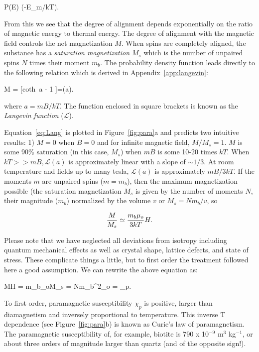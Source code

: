 \beq
P(E) \propto \exp (-E_m/kT).
\label{eq:PE}
\eeq

\noindent From this we see that the degree of alignment depends exponentially on the ratio of magnetic energy to thermal energy.  The degree of alignment with the magnetic field controls the net magnetization $M$.  When spins are completely aligned, the substance has a
 {\it saturation magnetization} $M_s$ which is the number of unpaired spins $N$ times their moment $m_b$.  The probability density function leads directly to the following relation which is derived in  Appendix~\ref{app:langevin}: 

\beq
{M} =
{ [\hbox{coth }a -
{
1
}]=(a).
}
\label{eq:Lang} 
\eeq

\noindent where  $a=mB/kT$. The function enclosed in square brackets is known as the 
{\it Langevin function} ($\mathcal{L}$).


Equation~\ref{eq:Lang} is plotted in   Figure~\ref{fig:para}a and predicts two intuitive results: 1) $M = 0$ when $B=0$ and for infinite magnetic field, $M/M_s = 1$.   $M$  is some 90\% 
saturation (in this case, $M_s$) when $mB$ is some 10-20 times $kT$. 
When $kT>> mB, \mathcal{L}(a)$ is approximately linear with a slope of
$\sim 1/3$.  At room temperature and fields up to many tesla, 
$\mathcal{L}(a)$ is approximately $ mB/3kT$. 
%
If the moments $m$ are unpaired spins ($m=m_b$), then the maximum magnetization possible (the saturation magnetization $M_s$ is given by the number of moments $N$,  their magnitude ($m_b$) normalized by the volume $v$ or  $M_s=Nm_b/v$,
so

$$
{M\over{M_s}} \simeq {
{ m_b \mu_o }\over
{3kT}
}
H .
$$

Please note that we have neglected all deviations from isotropy including quantum
mechanical effects as well as crystal shape, lattice defects, and state
of stress. These complicate things a little, but to first order the treatment followed here  a good assumption.  
We can rewrite the above equation as:


\beq
{M\over H} = {{m_b\mu_o}}\cdot M_s =
{{Nm_b^2\mu_o}} = \chi_p.
\eeq

 To first order,
 paramagnetic susceptibility $\chi_p$ is positive, 
larger than diamagnetism and inversely proportional to temperature.
This inverse T dependence (see Figure~\ref{fig:para}b)  is known as 
Curie's law of
paramagnetism.  The paramagnetic susceptibility of, for example, biotite is 790 x 10$^{-9}$ m$^3$ kg$^{-1}$, or about three orders of magnitude larger than quartz (and of the opposite sign!).  


